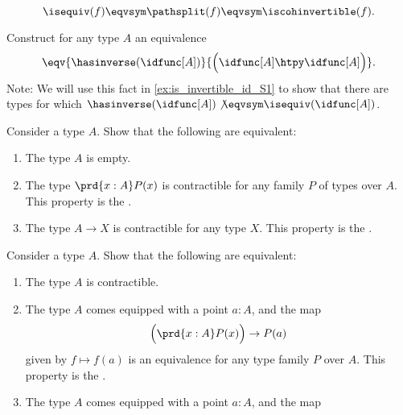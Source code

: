 \begin{exercises}
\begin{subexenum}
    \begin{equation*}
      \isequiv(f) \eqvsym \pathsplit(f) \eqvsym \iscohinvertible(f).
    \end{equation*}
  \item \label{ex:idfunc_autohtpy}Construct for any type $A$ an equivalence
    \begin{equation*}
      \eqv{\hasinverse(\idfunc[A])}{\Big(\idfunc[A]\htpy\idfunc[A]\Big)}.
    \end{equation*}
    Note: We will use this fact in \cref{ex:is_invertible_id_S1} to show that there
    are types for which $\hasinverse(\idfunc[A])\not\eqvsym\isequiv(\idfunc[A])$.
  \end{subexenum}
  \exitem \label{ex:up-emptyt}Consider a type $A$. Show that the following are equivalent:
  \begin{enumerate}
  \item The type $A$ is empty.
  \item \label{item:dup-empty}The type $\prd{x:A}P(x)$ is contractible for any family $P$ of types over $A$. This property is the .
  \item \label{item:up-empty}The type $A\to X$ is contractible for any type $X$. This property is the .
  \end{enumerate}
  \exitem \label{ex:up-unit}Consider a type $A$. Show that the following are equivalent:
  \begin{enumerate}
  \item \label{item:is-contr}The type $A$ is contractible.
  \item \label{item:dup-unit}The type $A$ comes equipped with a point $a:A$, and the map
    \begin{equation*}
      \Big(\prd{x:A}P(x)\Big)\to P(a)
    \end{equation*}
    given by $f\mapsto f(a)$ is an equivalence for any type family $P$ over $A$. This property is the .
  \item \label{item:up-unit}The type $A$ comes equipped with a point $a:A$, and the map

\end{enumerate}
\end{exercises}
